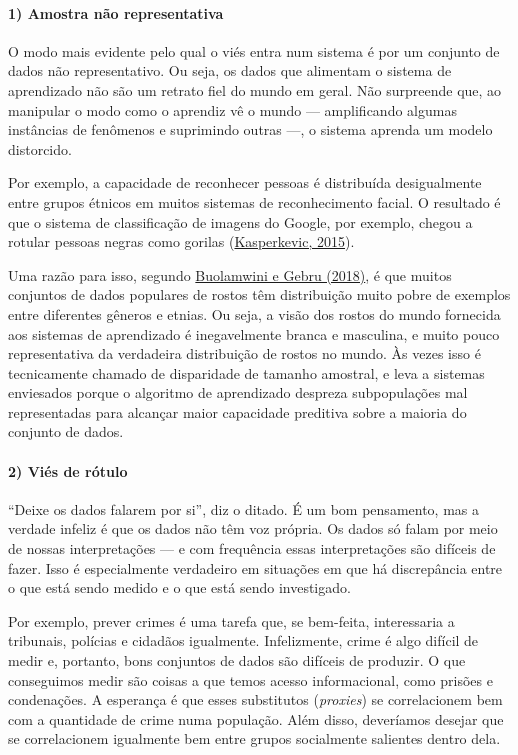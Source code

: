 \documentclass[
  11pt,
]{article}
\begin{document}
\paragraph{1) Amostra não
representativa}\label{amostra-nuxe3o-representativa}

O modo mais evidente pelo qual o viés entra num sistema é por um
conjunto de dados não representativo. Ou seja, os dados que alimentam o
sistema de aprendizado não são um retrato fiel do mundo em geral. Não
surpreende que, ao manipular o modo como o aprendiz vê o mundo ---
amplificando algumas instâncias de fenômenos e suprimindo outras ---, o
sistema aprenda um modelo distorcido.

Por exemplo, a capacidade de reconhecer pessoas é distribuída
desigualmente entre grupos étnicos em muitos sistemas de reconhecimento
facial. O resultado é que o sistema de classificação de imagens do
Google, por exemplo, chegou a rotular pessoas negras como gorilas
(\href{https://www.theguardian.com/technology/2015/jul/01/google-sorry-racist-auto-tag-photo-app}{Kasperkevic,
2015}).

Uma razão para isso, segundo
\href{http://proceedings.mlr.press/v81/buolamwini18a/buolamwini18a.pdf}{Buolamwini
e Gebru (2018)}, é que muitos conjuntos de dados populares de rostos têm
distribuição muito pobre de exemplos entre diferentes gêneros e etnias.
Ou seja, a visão dos rostos do mundo fornecida aos sistemas de
aprendizado é inegavelmente branca e masculina, e muito pouco
representativa da verdadeira distribuição de rostos no mundo. Às vezes
isso é tecnicamente chamado de disparidade de tamanho amostral, e leva a
sistemas enviesados porque o algoritmo de aprendizado despreza
subpopulações mal representadas para alcançar maior capacidade preditiva
sobre a maioria do conjunto de dados.

\paragraph{2) Viés de rótulo}\label{viuxe9s-de-ruxf3tulo}

``Deixe os dados falarem por si'', diz o ditado. É um bom pensamento,
mas a verdade infeliz é que os dados não têm voz própria. Os dados só
falam por meio de nossas interpretações --- e com frequência essas
interpretações são difíceis de fazer. Isso é especialmente verdadeiro em
situações em que há discrepância entre o que está sendo medido e o que
está sendo investigado.

Por exemplo, prever crimes é uma tarefa que, se bem-feita, interessaria
a tribunais, polícias e cidadãos igualmente. Infelizmente, crime é algo
difícil de medir e, portanto, bons conjuntos de dados são difíceis de
produzir. O que conseguimos medir são coisas a que temos acesso
informacional, como prisões e condenações. A esperança é que esses
substitutos (\emph{proxies}) se correlacionem bem com a quantidade de
crime numa população. Além disso, deveríamos desejar que se
correlacionem igualmente bem entre grupos socialmente salientes dentro
dela.
\end{document}
